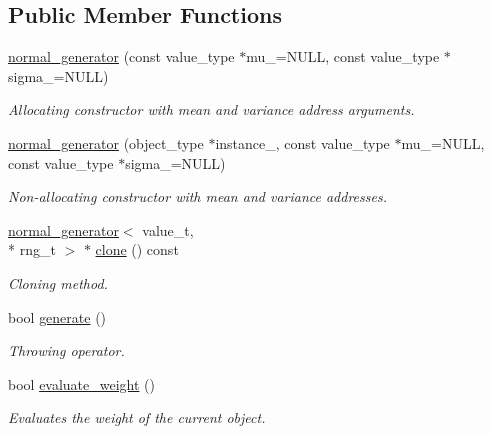 \subsection*{Public Member Functions}
\begin{DoxyCompactItemize}
\item 
\hypertarget{a00381_a5fa68e1fc9f59a63e44c982067d7b1de}{\hyperlink{a00381_a5fa68e1fc9f59a63e44c982067d7b1de}{normal\-\_\-generator} (const value\-\_\-type $\ast$mu\-\_\-=N\-U\-L\-L, const value\-\_\-type $\ast$sigma\-\_\-=N\-U\-L\-L)}\label{a00381_a5fa68e1fc9f59a63e44c982067d7b1de}

\begin{DoxyCompactList}\small\item\em Allocating constructor with mean and variance address arguments. \end{DoxyCompactList}\item 
\hypertarget{a00381_a7e29a2228ed20c64bd191d35eb64256e}{\hyperlink{a00381_a7e29a2228ed20c64bd191d35eb64256e}{normal\-\_\-generator} (object\-\_\-type $\ast$instance\-\_\-, const value\-\_\-type $\ast$mu\-\_\-=N\-U\-L\-L, const value\-\_\-type $\ast$sigma\-\_\-=N\-U\-L\-L)}\label{a00381_a7e29a2228ed20c64bd191d35eb64256e}

\begin{DoxyCompactList}\small\item\em Non-\/allocating constructor with mean and variance addresses. \end{DoxyCompactList}\item 
\hypertarget{a00381_a2dbac3922bbf37727f61efecfcea45d8}{\hyperlink{a00381}{normal\-\_\-generator}$<$ value\-\_\-t, \\*
rng\-\_\-t $>$ $\ast$ \hyperlink{a00381_a2dbac3922bbf37727f61efecfcea45d8}{clone} () const }\label{a00381_a2dbac3922bbf37727f61efecfcea45d8}

\begin{DoxyCompactList}\small\item\em Cloning method. \end{DoxyCompactList}\item 
\hypertarget{a00381_abe9367101dcd82fa1b9026634c4ec3b6}{bool \hyperlink{a00381_abe9367101dcd82fa1b9026634c4ec3b6}{generate} ()}\label{a00381_abe9367101dcd82fa1b9026634c4ec3b6}

\begin{DoxyCompactList}\small\item\em Throwing operator. \end{DoxyCompactList}\item 
\hypertarget{a00381_a09309bb03c9e37d685f547c9ce8532b8}{bool \hyperlink{a00381_a09309bb03c9e37d685f547c9ce8532b8}{evaluate\-\_\-weight} ()}\label{a00381_a09309bb03c9e37d685f547c9ce8532b8}

\begin{DoxyCompactList}\small\item\em Evaluates the weight of the current object. \end{DoxyCompactList}\end{DoxyCompactItemize}
